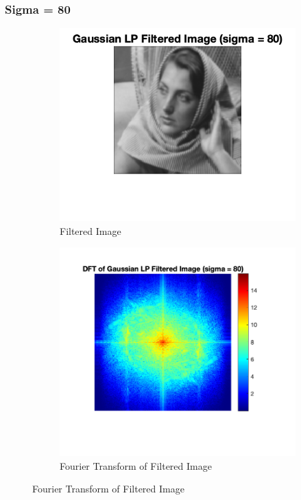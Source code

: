 \documentclass[12pt]{article}
\begin{document}
\subsubsection*{Sigma = 80}
\begin{figure}[H]
    \begin{subfigure}{.45\textwidth}
    \centering
      \includegraphics[width=1\linewidth]{../images/barbara_gaussian_LPF_80.png}
      \caption{Filtered Image}
    \end{subfigure}
    \begin{subfigure}{.5\textwidth}
    \centering
      \includegraphics[width=1\linewidth]{../images/barbara_DFT_gaussian_LPF_80.png}
      \caption{Fourier Transform of Filtered Image}
    \end{subfigure}
\end{figure}
\end{document}
